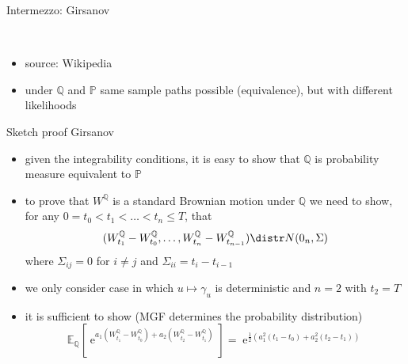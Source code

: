 \documentclass[pdf, handout]{beamer}
\newcommand{\e}{\operatorname{e}}
\begin{document}
%
\begin{frame}{Intermezzo: Girsanov}
\begin{figure}
\mbox{
  \quad
}
\end{figure}
\begin{itemize}
\item source: Wikipedia
\item under $\mathbb{Q}$ and $\mathbb{P}$ same sample paths possible (equivalence), but with different likelihoods
\end{itemize}
\end{frame}

\begin{frame}{Sketch proof Girsanov}
\begin{itemize}
\item given the integrability conditions, it is easy to show that $\mathbb{Q}$ is probability measure equivalent to $\mathbb{P}$
\item to prove that $W^{\mathbb{Q}}$ is a standard Brownian motion under $\mathbb{Q}$ we need to show, for any $0=t_0<t_1<\dots<t_n\leq T$, that
\[
(W_{t_1}^{\mathbb{Q}} - W_{t_0}^{\mathbb{Q}},\dots,W_{t_n}^{\mathbb{Q}} - W^{\mathbb{Q}}_{t_{n-1}})\distr N(0_n, \Sigma)
\]
where $\Sigma_{ij}=0$ for $i\neq j$ 
and $\Sigma_{ii} = t_i -t_{i-1}$
\item we only consider case in which $u\mapsto \gamma_u$ is deterministic and  $n=2$ with $t_2=T$
\item it is sufficient to show (MGF determines the probability distribution)
\[
\mathbb{E}_{\mathbb{Q}}\left[ \e^{a_1 (W^{\mathbb{Q}}_{t_1} - W^{\mathbb{Q}}_{t_0}) + a_2 (W^{\mathbb{Q}}_{t_2} - W^{\mathbb{Q}}_{t_1})}\right]  = \e^{\frac{1}{2}\left(a_1^2(t_1-t_0) + a_2^2(t_2-t_1)
\right)} 
\]
\end{itemize}
\end{frame}
\end{document}
